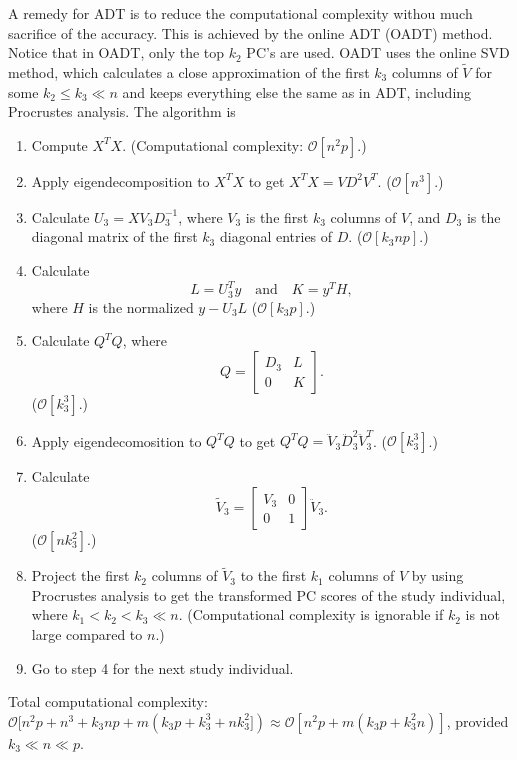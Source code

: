 \documentclass{article}
\newcommand{\bO}{\mathcal{O}}
\begin{document}
A remedy for ADT is to reduce the computational complexity withou much sacrifice of the accuracy.
This is achieved by the online ADT (OADT) method.
Notice that in OADT, only the top $k_2$ PC's are used.
OADT uses the online SVD method, which calculates a close approximation of the first $k_3$ columns of $\tilde{V}$ for some $k_2 \leq k_3 \ll n$ and keeps everything else the same as in ADT, including Procrustes analysis. 
The algorithm is
\begin{enumerate}
\item Compute $X^T X$.
  (Computational complexity: $\bO[n^2p]$.)  
\item Apply eigendecomposition to $X^T X$ to get $X^T X = V D^2 V^T$.
  ($\bO[n^3]$.)
\item Calculate $U_3 = X V_3 D_3^{-1}$,
  where $V_3$ is the first $k_3$ columns of $V$,
  and $D_3$ is the diagonal matrix of the first $k_3$ diagonal entries of $D$.
  ($\bO[k_3 n p]$.)
\item Calculate 
  \[
    L = U_3^T y \quad \text{and} \quad K = y^T H,
  \]
  where $H$ is the normalized  $y - U_3L$
  ($\bO[k_3 p]$.)
\item Calculate $Q^T Q$, where
  \[
    Q = 
    \begin{bmatrix}
      D_3 & L \\
      0 & K
    \end{bmatrix}.
  \]
  ($\bO[k_3^3]$.)
\item Apply eigendecomosition to $Q^T Q$ to get $Q^T Q = \ddot{V}_3 \ddot{D}^2_3 \ddot{V}^T_3$.
  ($\bO[k_3^3]$.)
\item Calculate
  \[
    \tilde{V}_3 =
    \begin{bmatrix}
      V_3 & 0 \\
      0 & 1
    \end{bmatrix}
    \ddot{V}_3.
  \]
  ($\bO[nk_3^2]$.)
\item Project the first $k_2$ columns of $\tilde{V}_3$ to the first $k_1$ columns of $V$ by using Procrustes analysis to get the transformed PC scores of the study individual,
  where $k_1 < k_2  < k_3 \ll n$.
  (Computational complexity is ignorable if $k_2$ is not large compared to $n$.)
  \item Go to step 4 for the next study individual.
\end{enumerate}

Total computational complexity: $\bO[n^2p + n^3 + k_3np + m(k_3p + k_3^3 + nk_3^2]) \approx \bO[n^2p + m(k_3p + k_3^2n)]$, provided $k_3 \ll n \ll p$.
\end{document}
